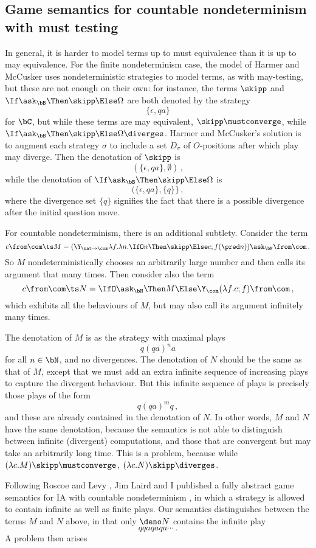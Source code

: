 
\subsection{Game semantics for countable nondeterminism with must testing}

In general, it is harder to model terms up to must equivalence than it is up to may equivalence.
For the finite nondeterminism case, the model of Harmer and McCusker \cite{mcCHFiniteND} uses nondeterministic strategies to model terms, as with may-testing, but these are not enough on their own: for instance, the terms $\skipp$ and $\If \ask_\bB \Then \skipp \Else \Omega$ are both denoted by the strategy
\[
  \{\epsilon,qa\}
  \]
for $\bC$, but while these terms are may equivalent, $\skipp \mustconverge$, while $\If \ask_\bB \Then \skipp \Else \Omega\diverges$.
Harmer and McCusker's solution is to augment each strategy $\sigma$ to include a set $D_\sigma$ of $O$-positions after which play may diverge.  
Then the denotation of $\skipp$ is
\[
  (\{\epsilon,qa\},\emptyset)\,,
  \]
while the denotation of $\If \ask_\bB \Then \skipp \Else \Omega$ is
\[
  (\{\epsilon,qa\},\{q\}\}\,,
  \]
where the divergence set $\{q\}$ signifies the fact that there is a possible divergence after the initial question move.

For countable nondeterminism, there is an additional subtlety.  
Consider the term
\[
  c \from\com \ts M = (\Y_{\nat \to \com} \lambda f.\lambda n.\IfO n \Then \skipp \Else c;f(\pred n)) \ask_\bN \from \com\,.
  \]
So $M$ nondeterministically chooses an arbitrarily large number and then calls its argument that many times.
Then consider also the term
\[
  c \from \com \ts N = \IfO \ask_\bN \Then M \Else \Y_{\com} (\lambda f.c;f) \from \com\,,
  \]
which exhibits all the behaviours of $M$, but may also call its argument infinitely many times.

The denotation of $M$ is as the strategy with maximal plays
\[
  q(qa)^na
  \]
for all $n\in\bN$, and no divergences.  
The denotation of $N$ should be the same as that of $M$, except that we must add an extra infinite sequence of increasing plays to capture the divergent behaviour.  
But this infinite sequence of plays is precisely those plays of the form
\[
  q(qa)^mq\,,
  \]
and these are already contained in the denotation of $N$.  
In other words, $M$ and $N$ have the same denotation, because the semantics is not able to distinguish between infinite (divergent) computations, and those that are convergent but may take an arbitrarily long time.
This is a problem, because while $(\lambda c.M)\skipp\mustconverge$, $(\lambda c.N)\skipp\diverges$.

Following Roscoe \cite{RoscoeCspInfinite} and Levy \cite{LevyGsInfinite}, Jim Laird and I published a fully abstract game semantics for IA with countable nondeterminism \cite{CslPaper}, in which a strategy is allowed to contain infinite as well as finite plays.
Our semantics distinguishes between the terms $M$ and $N$ above, in that only $\deno N$ contains the infinite play
\[
  qqaqaqa\cdots\,.
  \]
A problem then arises
